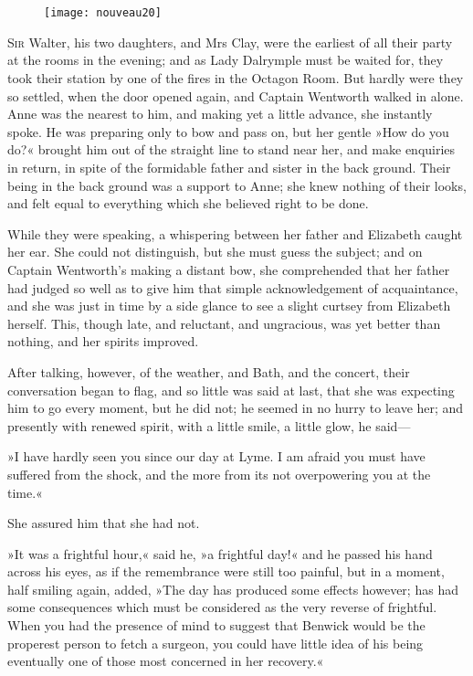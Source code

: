 \chapter[Chapter \thechapter]{}
	
\begin{figure}[t!]
\centering
\texttt{[image: nouveau20]}
\end{figure}

\lettrine[lines=4,lraise=0.3]{S}{ir} Walter, his two daughters, and Mrs Clay, were the earliest of all their party at the rooms in the evening; and as Lady Dalrymple must be waited for, they took their station by one of the fires in the Octagon Room. But hardly were they so settled, when the door opened again, and Captain Wentworth walked in alone. Anne was the nearest to him, and making yet a little advance, she instantly spoke. He was preparing only to bow and pass on, but her gentle »How do you do?« brought him out of the straight line to stand near her, and make enquiries in return, in spite of the formidable father and sister in the back ground. Their being in the back ground was a support to Anne; she knew nothing of their looks, and felt equal to everything which she believed right to be done.

While they were speaking, a whispering between her father and Elizabeth caught her ear. She could not distinguish, but she must guess the subject; and on Captain Wentworth's making a distant bow, she comprehended that her father had judged so well as to give him that simple acknowledgement of acquaintance, and she was just in time by a side glance to see a slight curtsey from Elizabeth herself. This, though late, and reluctant, and ungracious, was yet better than nothing, and her spirits improved.

After talking, however, of the weather, and Bath, and the concert, their conversation began to flag, and so little was said at last, that she was expecting him to go every moment, but he did not; he seemed in no hurry to leave her; and presently with renewed spirit, with a little smile, a little glow, he said—

»I have hardly seen you since our day at Lyme. I am afraid you must have suffered from the shock, and the more from its not overpowering you at the time.«

She assured him that she had not.

»It was a frightful hour,« said he, »a frightful day!« and he passed his hand across his eyes, as if the remembrance were still too painful, but in a moment, half smiling again, added, »The day has produced some effects however; has had some consequences which must be considered as the very reverse of frightful. When you had the presence of mind to suggest that Benwick would be the properest person to fetch a surgeon, you could have little idea of his being eventually one of those most concerned in her recovery.«

